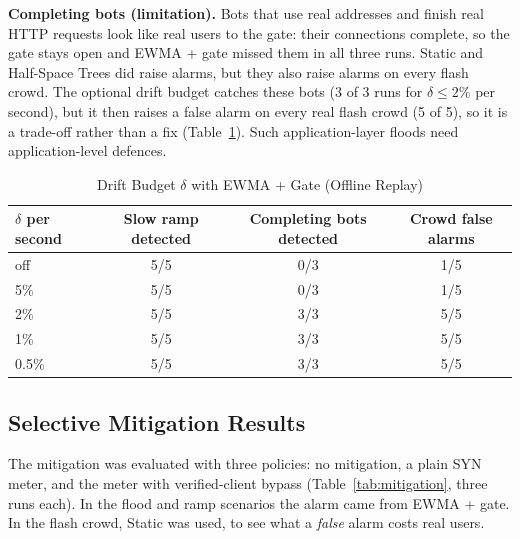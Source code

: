 \documentclass[12pt,a4paper]{article}
\begin{document}
\textbf{Completing bots (limitation).} Bots that use real addresses and finish
real HTTP requests look like real users to the gate: their connections complete,
so the gate stays open and EWMA + gate missed them in all three runs. Static
and Half-Space Trees did raise alarms, but they also raise alarms on every flash
crowd. The optional drift budget catches these bots (3 of 3 runs for
$\delta \le 2\%$ per second), but it then raises a false alarm on every real
flash crowd (5 of 5), so it is a trade-off rather than a fix
(Table~\ref{tab:drift}). Such application-layer floods need application-level
defences.

\begin{table}[H]
\centering
\caption{Drift Budget $\delta$ with EWMA + Gate (Offline Replay)}
\label{tab:drift}
\begin{tabular}{lccc}
\toprule
$\delta$ per second & Slow ramp detected & Completing bots detected & Crowd false alarms \\
\midrule
off            & 5/5 & 0/3 & 1/5 \\
5\%            & 5/5 & 0/3 & 1/5 \\
2\%            & 5/5 & 3/3 & 5/5 \\
1\%            & 5/5 & 3/3 & 5/5 \\
0.5\%          & 5/5 & 3/3 & 5/5 \\
\bottomrule
\end{tabular}
\end{table}

\subsection{Selective Mitigation Results}
The mitigation was evaluated with three policies: no mitigation, a plain SYN
meter, and the meter with verified-client bypass (Table~\ref{tab:mitigation},
three runs each). In the flood and ramp scenarios the alarm came from EWMA +
gate. In the flash crowd, Static was used, to see what a \emph{false} alarm
costs real users.
\end{document}
